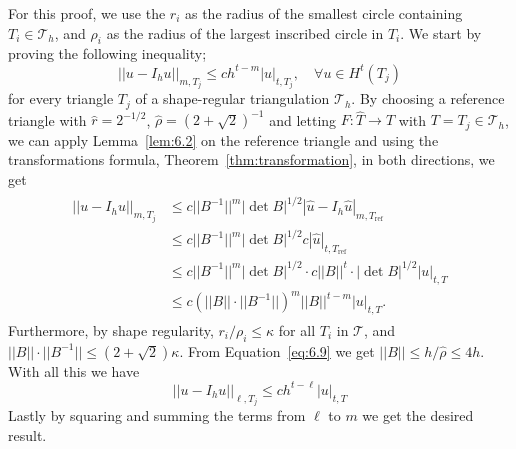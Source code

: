 \begin{bev}
    For this proof, we use the $r_i$ as the radius of the smallest circle containing $T_i\in \mathcal{T}_h$, 
    and $\rho_i$ as the radius of the largest inscribed circle in $T_i$.
    We start by proving the following inequality;
    \begin{equation}
        ||u-I_h u||_{m,T_j} \leq c h^{t-m} |u|_{t,T_j}, \quad \forall u \in H^t(T_j)
    \end{equation}
    for every triangle $T_j$ of a shape-regular triangulation $\mathcal{T}_h$. 
    By choosing a reference triangle with $\hat{r} = 2^{-1/2}$, $\hat{\rho} = {(2+\sqrt{2})}^{-1}$ and letting $F : \hat{T} \to T$ with $T = T_j \in \mathcal{T}_h$, 
    we can apply Lemma~\ref{lem:6.2} on the reference triangle and using the transformations formula, Theorem~\ref{thm:transformation}, in both directions, we get
    \begin{align}
        \begin{split}
        ||u-I_h u||_{m,T_j} &\leq c ||B^{-1}||^m |\det B |^{1/2} |\hat{u} - I_h \hat{u}|_{m,T_{\text{ref}}} \\
                            &\leq c ||B^{-1}||^m |\det B |^{1/2} c | \hat{u} |_{t,T_{\text{ref}}} \\
                            &\leq c ||B^{-1}||^m |\det B |^{1/2} \cdot c ||B||^t \cdot |\det B |^{1/2} |u|_{t,T}  \\
                         &\leq c {\left( ||B||  \cdot ||B^{-1}|| \right)}^m ||B||^{t-m} |u|_{t,T}.
        \end{split}
    \end{align}
    Furthermore, by shape regularity, $r_i / \rho_i \leq \kappa$ for all $T_i$ in $\mathcal{T}$, and $||B|| \cdot ||B^{-1}|| \leq \left( 2 + \sqrt{2} \right)\kappa$. 
    From Equation~\eqref{eq:6.9} we get $||B|| \leq h/\hat{\rho}\leq 4h$.
    With all this we have
    \begin{equation}
        ||u-I_h u||_{\ell,T_j} \leq c h^{t-\ell} |u|_{t,T}
    \end{equation}
    Lastly by squaring and summing the terms from $\ell$ to $m$ we get the desired result.
\end{bev}
